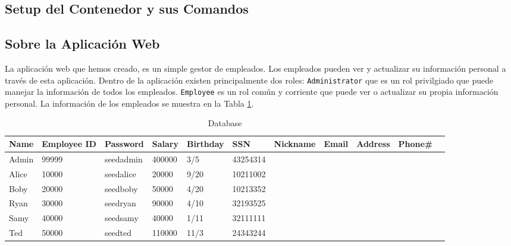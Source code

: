 \subsection{Setup del Contenedor y sus Comandos}








\subsection{Sobre la Aplicación Web} 

La aplicación web que hemos creado, es un simple gestor de empleados.
Los empleados pueden ver y actualizar su información personal a través de esta aplicación.
Dentro de la aplicación existen principalmente dos roles:
{\tt Administrator} que es un rol privilgiado que puede manejar la información de todos los empleados.
{\tt Employee} es un rol común y corriente que puede ver o actualizar su propia información personal. La información de los empleados se muestra en la Tabla
\ref{table:database}.

\begin{table}[htb]
\caption{Database}
\label{table:database}
\centering
\begin{adjustbox}{max width=\textwidth}
\begin{tabular}{|l|l|l|l|l|l|l|l|l|l|l|}
\hline
Name & Employee ID  & Password  &Salary  &Birthday  &SSN &Nickname &Email &Address &Phone\# \\
\hline
Admin 	& 99999       & seedadmin  &400000  &3/5   &43254314	& & & &\\
Alice 	& 10000       & seedalice  &20000   &9/20  &10211002	& & & &\\
Boby 	& 20000       & seedboby   &50000   &4/20  &10213352	& & & &\\
Ryan    & 30000       & seedryan   &90000   &4/10  &32193525	& & & &\\
Samy 	& 40000	      & seedsamy   &40000   &1/11  &32111111 	& & & &\\
Ted     & 50000	      & seedted    &110000  &11/3  &24343244	& & & &\\
\hline
\end{tabular}
\end{adjustbox}
\end{table}
 



